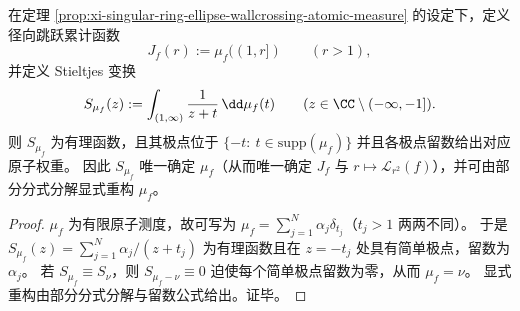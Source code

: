 \begin{corollary}\label{cor:xi-atomic-wallcrossing-stieltjes-identifiability}
在定理 \ref{prop:xi-singular-ring-ellipse-wallcrossing-atomic-measure} 的设定下，定义径向跳跃累计函数
\[
J_f(r):=\mu_f((1,r])\qquad(r>1),
\]
并定义 Stieltjes 变换
\[
S_{\mu_f}(z):=\int_{(1,\infty)}\frac{1}{z+t}\,\dd\mu_f(t)\qquad(z\in\CC\setminus(-\infty,-1]).
\]
则 \(S_{\mu_f}\) 为有理函数，且其极点位于 \(\{-t:\ t\in\mathrm{supp}(\mu_f)\}\) 并且各极点留数给出对应原子权重。
因此 \(S_{\mu_f}\) 唯一确定 \(\mu_f\)（从而唯一确定 \(J_f\) 与 \(r\mapsto \mathcal{L}_{r^2}(f)\)），并可由部分分式分解显式重构 \(\mu_f\)。
\end{corollary}
\begin{proof}
\(\mu_f\) 为有限原子测度，故可写为 \(\mu_f=\sum_{j=1}^N \alpha_j\delta_{t_j}\)（\(t_j>1\) 两两不同）。
于是
\(
S_{\mu_f}(z)=\sum_{j=1}^N \alpha_j/(z+t_j)
\)
为有理函数且在 \(z=-t_j\) 处具有简单极点，留数为 \(\alpha_j\)。
若 \(S_{\mu_f}\equiv S_{\nu}\)，则 \(S_{\mu_f-\nu}\equiv 0\) 迫使每个简单极点留数为零，从而 \(\mu_f=\nu\)。
显式重构由部分分式分解与留数公式给出。证毕。
\end{proof}

\endinput
